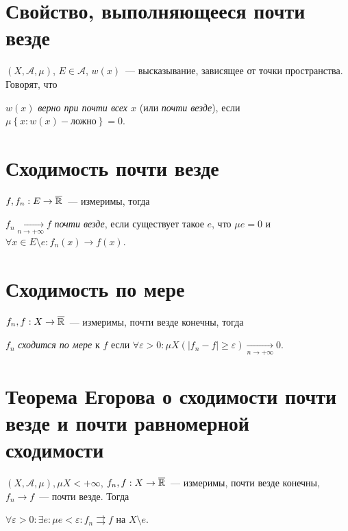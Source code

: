 \documentclass{article}
\begin{document}
    \section{Свойство, выполняющееся почти везде}
    
        $\left( X, \mathcal{A}, \mu \right)$, $E \in \mathcal{A}$, $w(x)$~--- высказывание, зависящее от точки пространства. Говорят, что
        
        $w(x)$ \textit{верно при почти всех $x$} (или \textit{почти везде}), если $\mu \left\{ x : w(x) - \text{ложно} \right\} = 0$.
        
    \newpage
    
    \section{Сходимость почти везде}
    
        $f, f_n : E \rightarrow \overline{\mathbb{R}}$~--- измеримы, тогда
        
        $f_n \xrightarrow[n \rightarrow +\infty]{} f$ \textit{почти везде}, если существует такое $e$, что $\mu e = 0$ и $\forall x \in E \setminus e : f_n(x) \rightarrow f(x)$.
        
    \newpage
    
    \section{Сходимость по мере}
    
        $f_n, f : X \rightarrow \overline{\mathbb{R}}$~--- измеримы, почти везде конечны, тогда
        
        $f_n$ \textit{сходится по мере} к $f$ если $\forall \varepsilon > 0 : \mu X \left( | f_n - f | \geqslant \varepsilon \right) \xrightarrow[n \rightarrow +\infty]{} 0$.
        
    \newpage
    
    \section{Теорема Егорова о сходимости почти везде и почти равномерной сходимости}
    
        $\left( X, \mathcal{A}, \mu \right), \mu X < +\infty$, $f_n, f : X \rightarrow \overline{\mathbb{R}}$~--- измеримы, почти везде конечны, $f_n \rightarrow f$~--- почти везде. Тогда
        
        $\forall \varepsilon > 0 : \exists e : \mu e < \varepsilon : f_n \rightrightarrows f$ на $X \setminus e$.
        
\end{document}
